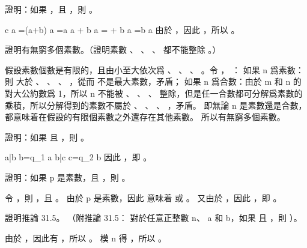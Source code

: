 \startsection[
  title={Elementary number-theoretic notions},
]

\startEXERCISE
證明：如果 ，且 ，則 。
\stopEXERCISE

\startANSWER
\startformula\startmathalignment
\NC c \mod a
       =\NC (a+b) \mod a \NR
\NC =\NC a \mod a + b \mod a \NR
\NC = + b \mod a \NR
\NC =\NC b \mod a \NR
\stopmathalignment\stopformula
由於 ，因此 ，所以 。
\stopANSWER

\startEXERCISE
證明有無窮多個素數。（\hint 證明素數 、 、 \m{\ldots}、  都不能整除 。）
\stopEXERCISE

\startANSWER
假設素數個數是有限的，且由小至大依次爲 、 、 \m{\ldots}、 。令 ， ：
\startigBase[n]
\startitem
如果 n 爲素數：則  大於 、 、 \m{\ldots}、 ，從而  不是最大素數，矛盾；
\stopitem
\startitem
如果 n 爲合數：由於 m 和 n 的對大公約數爲 1，所以 n 不能被 、 、 \m{\ldots}、  整除，但是任一合數都可分解爲素數的乘積，所以分解得到的素數不屬於 、 、 \m{\ldots}、 ，矛盾。
\stopitem
\stopigBase
即無論 n 是素數還是合數，都意味着在假設的有限個素數之外還存在其他素數。
所以有無窮多個素數。
\stopANSWER

\startEXERCISE
證明：如果  且 ，則 。
\stopEXERCISE

\startANSWER
\startformula\startmathalignment
\NC a|b \Rightarrow \NC b=q_1 a \NR
\NC b|c \Rightarrow \NC c=q_2 b \NR
\stopmathalignment\stopformula
因此 ，即 。
\stopANSWER

\startEXERCISE
證明：如果 p 是素數，且 ，則 。
\stopEXERCISE

\startANSWER
令 ，則 ，且 。
由於 p 是素數，因此  意味着  或 。
又由於 ，因此 ，即 。
\stopANSWER

\startEXERCISE
證明推論 31.5。
（附{\EMP 推論 31.5}：
對於任意正整數 n、 a 和 b，如果  且 ，則 ）。
\stopEXERCISE

\startANSWER
由於 ，因此有 ，所以 。
模 n 得 ，所以 。
\stopANSWER

